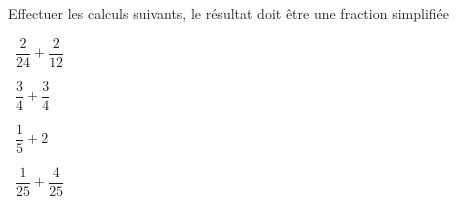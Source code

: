 Effectuer les calculs suivants, le résultat doit être une fraction simplifiée
\begin{questions}
	
	\question[2]  $\dfrac{2}{24} + \dfrac{2}{12}$
	\fillwithdottedlines{3.5cm}
	\begin{solution}
		
	\end{solution}	

	\question[2]  $\dfrac{3}{4} + \dfrac{3}{4}$
	\fillwithdottedlines{3.5cm}
	\begin{solution}
		
	\end{solution}	

	\question[2]  $\dfrac{1}{5} + 2$
	\fillwithdottedlines{3.5cm}
	\begin{solution}
		
	\end{solution}

	\question[2]  $\dfrac{1}{25} + \dfrac{4}{25}$
	\fillwithdottedlines{3.5cm}
	\begin{solution}
		
	\end{solution}
\end{questions}